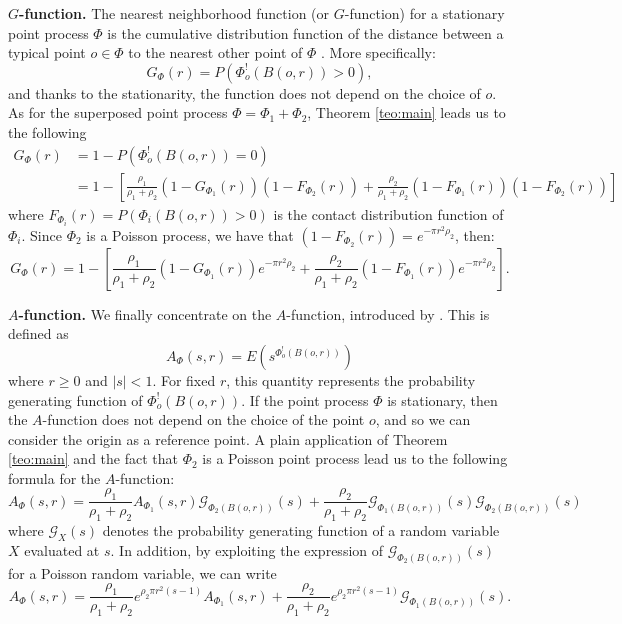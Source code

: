 \documentclass[11pt,a4paper,oneside]{article}
\newcommand{\E}{E}
\theoremstyle{definition}
\theoremstyle{remark}
\begin{document}
\noindent
\textbf{$G$-function.} The nearest neighborhood function (or $G$-function) for a stationary point process $\Phi$ is the cumulative distribution function of the distance between a typical point  $o \in \Phi$ to the nearest other point of $\Phi$ \citep{BaddeleyRubakTurner2015}. More specifically:
\[
G_\Phi (r) = P (\Phi_o^! (B (o, r))>0),
\]
and thanks to the stationarity, the function does not depend on the choice of $o$.
As for the superposed point process $\Phi= \Phi_1 + \Phi_2$, Theorem \ref{teo:main} leads us to the following
\[
\begin{split}
G_\Phi (r) &= 1- P (\Phi_o^! (B (o, r))=0) \\
& =
1- \left[\frac{\rho_1}{\rho_1 + \rho_2} (1-G_{\Phi_1} (r)) (1- F_{\Phi_2} (r))+ \frac{\rho_2}{\rho_1 + \rho_2}
(1- F_{\Phi_1} (r)) (1-F_{\Phi_2} (r))
\right]
\end{split}
\]
where $F_{\Phi_i } (r) =  P (\Phi_i (B (o, r))>0)$ is the contact distribution function of $\Phi_i$. Since $\Phi_2$ is a Poisson process, we have that $(1-F_{\Phi_2} (r))= e^{- \pi r^2 \rho_2}$, then:
\begin{equation}
    \label{eq:G_function_superposed}
    G_\Phi (r) =
1- \left[\frac{\rho_1}{\rho_1 + \rho_2} (1-G_{\Phi_1} (r)) e^{- \pi r^2 \rho_2}+ \frac{\rho_2}{\rho_1 + \rho_2}
(1- F_{\Phi_1} (r)) e^{- \pi r^2 \rho_2}
\right].
\end{equation}


\noindent
\textbf{$A$-function.}
We finally concentrate on the $A$-function, introduced by \cite{chiu2008reduced}. This is defined as
\[
A_{\Phi} (s, r) = \E \left( s^{\Phi_o^! (B (o, r))}\right)
\]
where $r \geq 0$ and $|s|<1$. For fixed $r$, this quantity represents the probability generating function of 
$\Phi_o^! (B (o, r))$. If the point process $\Phi$ is stationary, then the $A$-function does not depend on the choice of the point $o$, and so we can consider the origin as a reference point. A plain application of Theorem \ref{teo:main} and the fact that $\Phi_2$ is a Poisson point process lead us to the following formula for the $A$-function:
\[
 A_{\Phi} (s, r) = \frac{\rho_1}{\rho_1+ \rho_2}   A_{\Phi_1} (s, r) \mathcal{G}_{\Phi_2 (B (o, r))} (s)
  +  \frac{\rho_2}{\rho_1+ \rho_2}   \mathcal{G}_{\Phi_1 (B (o, r))} (s) \mathcal{G}_{\Phi_2 (B (o, r))} (s)
\]
where $\mathcal{G}_X (s)$ denotes the probability generating function of a random variable $X$ evaluated at $s$.
In addition, by exploiting the expression of $\mathcal{G}_{\Phi_2 (B (o, r))} (s)$ for a Poisson random variable, we can write
\begin{equation}
    \label{eq:A_superposed}
    A_{\Phi} (s, r) = \frac{\rho_1}{\rho_1+ \rho_2}  e^{\rho_2 \pi r^2 (s-1)} A_{\Phi_1} (s, r)
  +  \frac{\rho_2}{\rho_1+ \rho_2}  e^{\rho_2 \pi r^2 (s-1)} \mathcal{G}_{\Phi_1 (B (o, r))} (s).
\end{equation}
\end{document}
